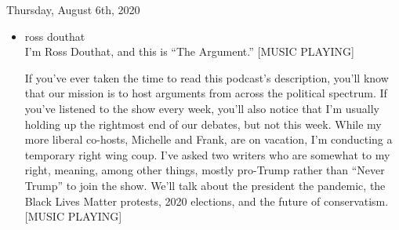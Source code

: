 Thursday, August 6th, 2020

\begin{itemize}
\item
  ross douthat\\
  I'm Ross Douthat, and this is ``The Argument.'' {[}MUSIC PLAYING{]}

  If you've ever taken the time to read this podcast's description,
  you'll know that our mission is to host arguments from across the
  political spectrum. If you've listened to the show every week, you'll
  also notice that I'm usually holding up the rightmost end of our
  debates, but not this week. While my more liberal co-hosts, Michelle
  and Frank, are on vacation, I'm conducting a temporary right wing
  coup. I've asked two writers who are somewhat to my right, meaning,
  among other things, mostly pro-Trump rather than ``Never Trump'' to
  join the show. We'll talk about the president the pandemic, the Black
  Lives Matter protests, 2020 elections, and the future of conservatism.
  {[}MUSIC PLAYING{]}


\end{itemize}
